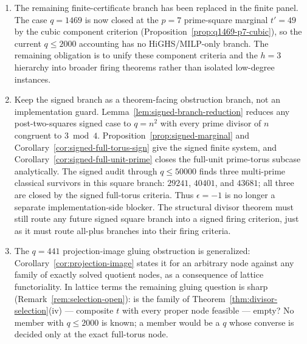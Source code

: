\documentclass[11pt]{article}
\theoremstyle{plain}
\theoremstyle{definition}
\theoremstyle{remark}
\begin{document}
\begin{enumerate}
leaves four survivors of which these are two, and the family's
remaining obligations are the Stickelberger lemma for the firing
condition, unconditionality of the two instances, and a refinement for
the two wall witnesses (Remark~\ref{rem:fold-gaps}).  The secondary branch is
now empty: the full-unit prime-power criterion
(Proposition~\ref{prop:pe-full-unit-nested}), the $C_{57}$ criterion
(Proposition~\ref{prop:c57-sqrt57}), and the measured box gate for
degree-$4$/$5$ period joins promote its last four orders.  The families
still needing firing characterizations are the very wide period joins
(the lattice-reduced enumeration now evaluates every node up to
$\sim2\cdot10^7$ true lattice points; the surviving refusals $8865$,
$8905$, $9265$ sit at $10^9$--$10^{42}$ points and need an argument,
not enumeration), the $h=3$ PAF stage at wide nodes, the composite
component joins beyond the instances above, and composite-$t$ top
nodes.

\item The remaining finite-certificate branch has been replaced in the finite
panel.  The case $q=1469$ is now closed at the $p=7$ prime-square marginal
$t'=49$ by the cubic component criterion
(Proposition~\ref{prop:q1469-p7-cubic}), so the current $q\le2000$
accounting has no HiGHS/MILP-only branch.  The remaining obligation is to
unify these component criteria and the $h=3$ hierarchy into broader firing
theorems rather than isolated low-degree instances.

\item Keep the signed branch as a theorem-facing obstruction branch, not an
implementation guard.  Lemma~\ref{lem:signed-branch-reduction} reduces any
post-two-squares signed case to
$q=n^2$ with every prime divisor of $n$ congruent to $3\bmod4$.
Proposition~\ref{prop:signed-marginal} and
Corollary~\ref{cor:signed-full-torus-sign} give the signed finite system, and
Corollary~\ref{cor:signed-full-unit-prime} closes the full-unit prime-torus
subcase analytically.  The signed audit through $q\le50000$ finds three
multi-prime classical survivors in this square branch:
$29241$, $40401$, and $43681$; all three are closed by the signed full-torus
criteria.  Thus $\epsilon=-1$ is no longer a separate implementation-side
blocker.  The structural divisor theorem must still route any future signed
square branch into a signed firing criterion, just as it must route all-plus
branches into their firing criteria.

\item The $q=441$ projection-image gluing obstruction is generalized:
Corollary~\ref{cor:projection-image} states it for an arbitrary node
against any family of exactly solved quotient nodes, as a consequence of
lattice functoriality.  In lattice terms the remaining gluing question is
sharp (Remark~\ref{rem:selection-open}): is the family of
Theorem~\ref{thm:divisor-selection}(iv) --- composite $t$ with every
proper node feasible --- empty?  No member with $q\le2000$ is known; a
member would be a $q$ whose converse is decided only at the exact
full-torus node.


\end{enumerate}
\end{document}
